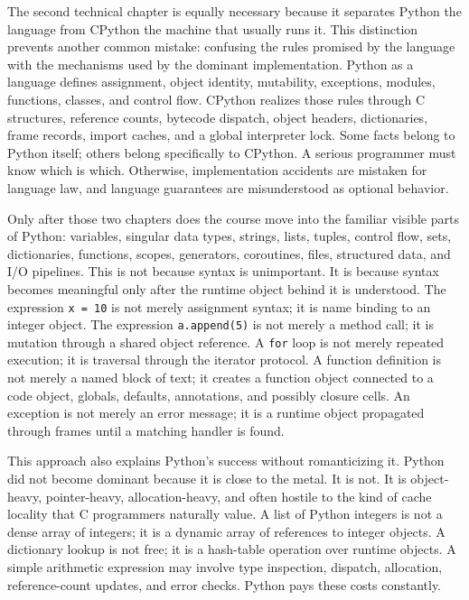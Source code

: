 The second technical chapter is equally necessary because it separates Python the language from CPython the machine that usually runs it. This distinction prevents another common mistake: confusing the rules promised by the language with the mechanisms used by the dominant implementation. Python as a language defines assignment, object identity, mutability, exceptions, modules, functions, classes, and control flow. CPython realizes those rules through C structures, reference counts, bytecode dispatch, object headers, dictionaries, frame records, import caches, and a global interpreter lock. Some facts belong to Python itself; others belong specifically to CPython. A serious programmer must know which is which. Otherwise, implementation accidents are mistaken for language law, and language guarantees are misunderstood as optional behavior.

Only after those two chapters does the course move into the familiar visible parts of Python: variables, singular data types, strings, lists, tuples, control flow, sets, dictionaries, functions, scopes, generators, coroutines, files, structured data, and I/O pipelines. This is not because syntax is unimportant. It is because syntax becomes meaningful only after the runtime object behind it is understood. The expression \texttt{x = 10} is not merely assignment syntax; it is name binding to an integer object. The expression \texttt{a.append(5)} is not merely a method call; it is mutation through a shared object reference. A \texttt{for} loop is not merely repeated execution; it is traversal through the iterator protocol. A function definition is not merely a named block of text; it creates a function object connected to a code object, globals, defaults, annotations, and possibly closure cells. An exception is not merely an error message; it is a runtime object propagated through frames until a matching handler is found.

This approach also explains Python’s success without romanticizing it. Python did not become dominant because it is close to the metal. It is not. It is object-heavy, pointer-heavy, allocation-heavy, and often hostile to the kind of cache locality that C programmers naturally value. A list of Python integers is not a dense array of integers; it is a dynamic array of references to integer objects. A dictionary lookup is not free; it is a hash-table operation over runtime objects. A simple arithmetic expression may involve type inspection, dispatch, allocation, reference-count updates, and error checks. Python pays these costs constantly.

